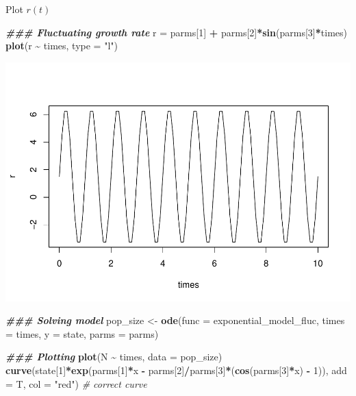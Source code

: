 \documentclass[
]{book}
\newenvironment{Shaded}{\begin{snugshade}}{\end{snugshade}}
\newcommand{\AttributeTok}[1]{\textcolor[rgb]{0.13,0.29,0.53}{#1}}
\newcommand{\CommentTok}[1]{\textcolor[rgb]{0.56,0.35,0.01}{\textit{#1}}}
\newcommand{\DecValTok}[1]{\textcolor[rgb]{0.00,0.00,0.81}{#1}}
\newcommand{\DocumentationTok}[1]{\textcolor[rgb]{0.56,0.35,0.01}{\textbf{\textit{#1}}}}
\newcommand{\FunctionTok}[1]{\textcolor[rgb]{0.13,0.29,0.53}{\textbf{#1}}}
\newcommand{\NormalTok}[1]{#1}
\newcommand{\OtherTok}[1]{\textcolor[rgb]{0.56,0.35,0.01}{#1}}
\newcommand{\SpecialCharTok}[1]{\textcolor[rgb]{0.81,0.36,0.00}{\textbf{#1}}}
\newcommand{\StringTok}[1]{\textcolor[rgb]{0.31,0.60,0.02}{#1}}
\begin{document}
Plot \(r(t)\)

\begin{Shaded}
\begin{Highlighting}[]
\DocumentationTok{\#\#\# Fluctuating growth rate}
\NormalTok{r }\OtherTok{=}\NormalTok{ parms[}\DecValTok{1}\NormalTok{] }\SpecialCharTok{+}\NormalTok{ parms[}\DecValTok{2}\NormalTok{]}\SpecialCharTok{*}\FunctionTok{sin}\NormalTok{(parms[}\DecValTok{3}\NormalTok{]}\SpecialCharTok{*}\NormalTok{times)}
\FunctionTok{plot}\NormalTok{(r }\SpecialCharTok{\textasciitilde{}}\NormalTok{ times, }\AttributeTok{type =} \StringTok{"l"}\NormalTok{)}
\end{Highlighting}
\end{Shaded}

\includegraphics{bookdown-demo_files/figure-latex/unnamed-chunk-9-1.pdf}

\begin{Shaded}
\begin{Highlighting}[]
\DocumentationTok{\#\#\# Solving model}
\NormalTok{pop\_size }\OtherTok{\textless{}{-}} \FunctionTok{ode}\NormalTok{(}\AttributeTok{func =}\NormalTok{ exponential\_model\_fluc, }\AttributeTok{times =}\NormalTok{ times, }\AttributeTok{y =}\NormalTok{ state, }\AttributeTok{parms =}\NormalTok{ parms)}

\DocumentationTok{\#\#\# Plotting}
\FunctionTok{plot}\NormalTok{(N }\SpecialCharTok{\textasciitilde{}}\NormalTok{ times, }\AttributeTok{data =}\NormalTok{ pop\_size)}
\FunctionTok{curve}\NormalTok{(state[}\DecValTok{1}\NormalTok{]}\SpecialCharTok{*}\FunctionTok{exp}\NormalTok{(parms[}\DecValTok{1}\NormalTok{]}\SpecialCharTok{*}\NormalTok{x }\SpecialCharTok{{-}}\NormalTok{ parms[}\DecValTok{2}\NormalTok{]}\SpecialCharTok{/}\NormalTok{parms[}\DecValTok{3}\NormalTok{]}\SpecialCharTok{*}\NormalTok{(}\FunctionTok{cos}\NormalTok{(parms[}\DecValTok{3}\NormalTok{]}\SpecialCharTok{*}\NormalTok{x) }\SpecialCharTok{{-}} \DecValTok{1}\NormalTok{)), }\AttributeTok{add =}\NormalTok{ T, }\AttributeTok{col =} \StringTok{"red"}\NormalTok{) }\CommentTok{\# correct curve}
\end{Highlighting}
\end{Shaded}
\end{document}
